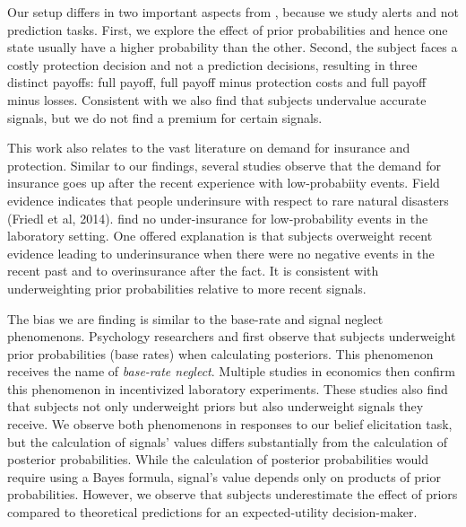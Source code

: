 \documentclass[12pt,a4paper]{article}
\begin{document}
Our setup differs in two important aspects from \citet{ambuehl_belief_2018}, because we study alerts and not prediction tasks. First, we explore the effect of prior probabilities and hence one state usually have a higher probability than the other. Second, the subject faces a costly protection decision and not a prediction decisions, resulting in three distinct payoffs: full payoff, full payoff minus protection costs and full payoff minus losses. Consistent with \citet{ambuehl_belief_2018} we also find that subjects undervalue accurate signals, but we do not find a premium for certain signals. 

This work also relates to the vast literature on demand for insurance and protection. Similar to our findings, several studies observe that the demand for insurance goes up after the recent experience with low-probabiity events. Field evidence indicates that people underinsure with respect to rare natural disasters (Friedl et al, 2014). \citet{laury_insurance_2009} find no under-insurance for low-probability events in the laboratory setting. One offered explanation \citep{volkman-wise_representativeness_2015} is that subjects overweight recent evidence leading to underinsurance when there were no negative events in the recent past and to overinsurance after the fact. It is consistent with underweighting prior probabilities relative to more recent signals. 

The bias we are finding is similar to the base-rate and signal neglect phenomenons. Psychology researchers \citet{hammerton_case_1973} and \citet{kahneman_psychology_1973} first observe that subjects underweight prior probabilities (base rates) when calculating posteriors. This phenomenon receives the name of \textit{base-rate neglect}. Multiple studies in economics then confirm \citep*{grether_testing_1992, holt_update_2009} this phenomenon in incentivized laboratory experiments. These studies also find that subjects not only underweight priors but also underweight signals they receive.  We observe both phenomenons in responses to our belief elicitation task, but the calculation of signals' values differs substantially from the calculation of posterior probabilities. While the calculation of posterior probabilities would require using a Bayes formula, signal's value depends only on products of prior probabilities. However, we observe that subjects underestimate the effect of priors compared to theoretical predictions for an expected-utility decision-maker.


\vspace{20pt}
\end{document}
